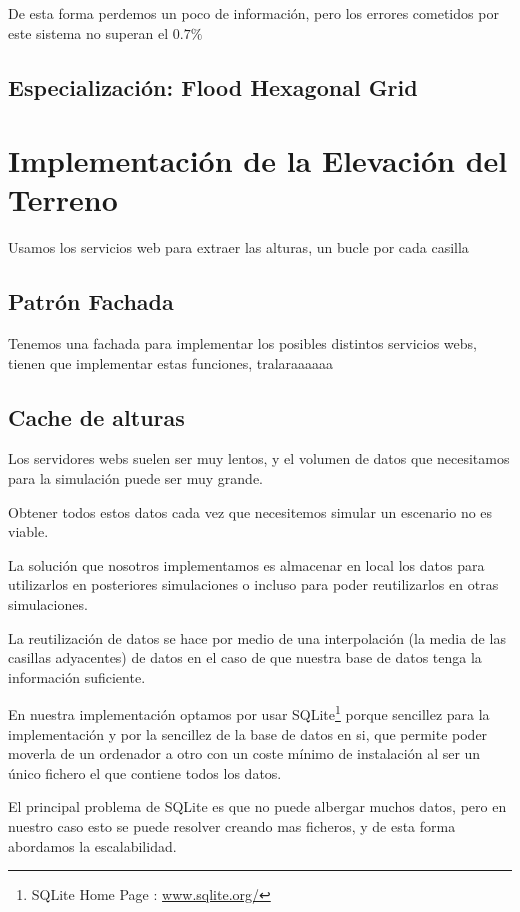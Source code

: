 De esta forma perdemos un poco de información, pero los errores cometidos por
este sistema no superan el \begin{math} 0.7\% \end{math}

\subsection*{Especialización: Flood Hexagonal Grid}
\section*{Implementación de la Elevación del Terreno}
Usamos los servicios web para extraer las alturas, un bucle por cada casilla
\subsection*{Patrón Fachada} %
Tenemos una fachada para implementar los posibles distintos servicios webs,
tienen que implementar estas funciones, tralaraaaaaa
\subsection*{Cache de alturas}
Los servidores webs suelen ser muy lentos, y el volumen de datos que
necesitamos para la simulación puede ser muy grande.

Obtener todos estos datos cada vez que necesitemos simular un escenario no es
viable.

La solución que nosotros implementamos es almacenar en local los datos para
utilizarlos en posteriores simulaciones o incluso para poder reutilizarlos en
otras simulaciones.

La reutilización de datos se hace por medio de una interpolación (la media de
las casillas adyacentes) de datos en el caso de que nuestra base de datos tenga
la información suficiente.

En nuestra implementación optamos por usar  SQLite\footnote{SQLite Home Page :
\url{www.sqlite.org/}} porque sencillez para la
implementación y por la sencillez de la base de datos en si, que permite poder
moverla de un ordenador a otro con un coste mínimo de instalación al ser un
único fichero el que contiene todos los datos.

El principal problema de SQLite es que no puede albergar muchos datos, pero en
nuestro caso esto se puede resolver creando mas ficheros, y de esta forma
abordamos la escalabilidad.

